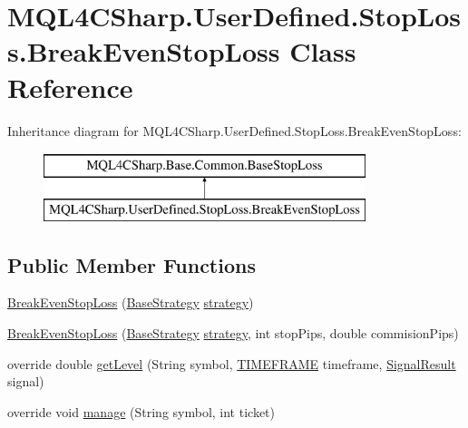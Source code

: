\hypertarget{class_m_q_l4_c_sharp_1_1_user_defined_1_1_stop_loss_1_1_break_even_stop_loss}{}\section{M\+Q\+L4\+C\+Sharp.\+User\+Defined.\+Stop\+Loss.\+Break\+Even\+Stop\+Loss Class Reference}
\label{class_m_q_l4_c_sharp_1_1_user_defined_1_1_stop_loss_1_1_break_even_stop_loss}
Inheritance diagram for M\+Q\+L4\+C\+Sharp.\+User\+Defined.\+Stop\+Loss.\+Break\+Even\+Stop\+Loss\+:\begin{figure}[H]
\begin{center}
\leavevmode
\includegraphics[height=2.000000cm]{class_m_q_l4_c_sharp_1_1_user_defined_1_1_stop_loss_1_1_break_even_stop_loss}
\end{center}
\end{figure}
\subsection*{Public Member Functions}
\begin{DoxyCompactItemize}
\item 
\hyperlink{class_m_q_l4_c_sharp_1_1_user_defined_1_1_stop_loss_1_1_break_even_stop_loss_adf4193e0d50916341c85aada5edd76d4}{Break\+Even\+Stop\+Loss} (\hyperlink{class_m_q_l4_c_sharp_1_1_base_1_1_base_strategy}{Base\+Strategy} \hyperlink{class_m_q_l4_c_sharp_1_1_base_1_1_common_1_1_base_stop_loss_a8cbd2ea8e6ab4e5af253a32116905162}{strategy})
\item 
\hyperlink{class_m_q_l4_c_sharp_1_1_user_defined_1_1_stop_loss_1_1_break_even_stop_loss_a0066f1526bccb7bc336b7282f7c2e5d0}{Break\+Even\+Stop\+Loss} (\hyperlink{class_m_q_l4_c_sharp_1_1_base_1_1_base_strategy}{Base\+Strategy} \hyperlink{class_m_q_l4_c_sharp_1_1_base_1_1_common_1_1_base_stop_loss_a8cbd2ea8e6ab4e5af253a32116905162}{strategy}, int stop\+Pips, double commision\+Pips)
\item 
override double \hyperlink{class_m_q_l4_c_sharp_1_1_user_defined_1_1_stop_loss_1_1_break_even_stop_loss_accdae06da609037918edf4de5280fd4e}{get\+Level} (String symbol, \hyperlink{namespace_m_q_l4_c_sharp_1_1_base_1_1_enums_a838810aaa87c63c12737408dba8c0b35}{T\+I\+M\+E\+F\+R\+A\+ME} timeframe, \hyperlink{class_m_q_l4_c_sharp_1_1_base_1_1_common_1_1_signal_result}{Signal\+Result} signal)
\item 
override void \hyperlink{class_m_q_l4_c_sharp_1_1_user_defined_1_1_stop_loss_1_1_break_even_stop_loss_a547ef9145f8fde327443f687f8040399}{manage} (String symbol, int ticket)
\end{DoxyCompactItemize}
